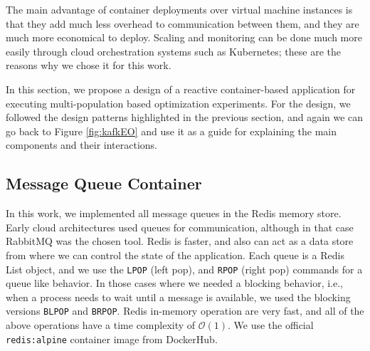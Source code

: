 \documentclass[review]{elsarticle}
\begin{document}
The main advantage of container deployments over virtual machine
instances is that they add much less overhead to communication between
them, and they are much more economical to deploy. Scaling and
monitoring can be done much more easily through cloud orchestration
systems such as Kubernetes; these are the reasons why we chose it for
this work.

In this section, we propose a design of a reactive container-based application
for executing multi-population based optimization experiments.  For the design,
we followed the design patterns highlighted in the previous section, and again
we can go back to Figure \ref{fig:kafkEO} and use it as a guide for explaining
the main components and their interactions. 



 

\subsection{Message Queue Container} 
\label{message_container}

In this work, we implemented all message
queues in the Redis memory store. Early cloud architectures
\cite{de2017parallel} used queues for communication, although in that
case RabbitMQ was the chosen tool. Redis is faster, and also can act
as a data store from where we can control the state of the application.
Each queue is a Redis List object, and we use
the \texttt{LPOP} (left pop), and \texttt{RPOP} (right pop) commands for a queue like behavior.
In those cases where we needed a blocking behavior, i.e., when a process needs
to wait until a message is available, we used the blocking versions \texttt{BLPOP} and
\texttt{BRPOP}. Redis in-memory operation are very fast, and all of the above 
operations have a time complexity of $\mathcal{O}(1)$. We use the official 
\texttt{redis:alpine} container image from DockerHub.  
\end{document}
